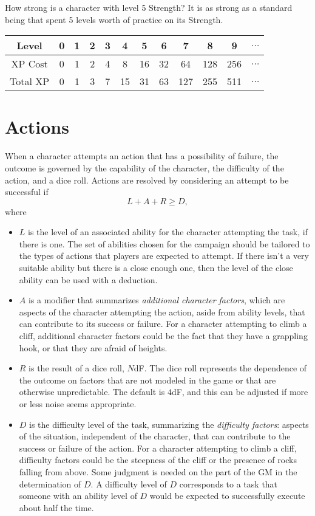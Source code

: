 How strong is a character with level 5 Strength? It is as strong as a standard being that spent 5 levels worth of practice on its Strength.


\begin{center}
\begin{tabular}{|c|c|c|c|c|c|c|c|c|c|c|c|}
\hline
Level    & 0 & 1 & 2 & 3 & 4  & 5  & 6  & 7   & 8   & 9   & $\ldots$ \\ \hline
XP Cost  & 0 & 1 & 2 & 4 & 8  & 16 & 32 & 64  & 128 & 256 & $\ldots$ \\ \hline
Total XP & 0 & 1 & 3 & 7 & 15 & 31 & 63 & 127 & 255 & 511 & $\ldots$ \\ \hline
\end{tabular}
\end{center}


\section{Actions}
When a character attempts an action that has a possibility of failure, the outcome is governed by the capability of the character, the difficulty of the action, and a dice roll.
Actions are resolved by considering an attempt to be successful if
$$L + A + R \geq D,$$
where
\begin{itemize}
\item
$L$ is the level of an associated ability for the character attempting the task, if there is one.
The set of abilities chosen for the campaign should be tailored to the types of actions that players are expected to attempt.
If there isn’t a very suitable ability but there is a close enough one, then the level of the close ability can be used with a deduction.
\item
$A$ is a modifier that summarizes \emph{additional character factors},
which are aspects of the character attempting the action,
aside from ability levels,
that can contribute to its success or failure.
For a character attempting to climb a cliff,
additional character factors could be the fact that they
have a grappling hook,
or that they are afraid of heights.
\item 
$R$ is the result of a dice roll, $N$dF.
The dice roll represents the dependence of the outcome on factors that are not modeled in the game or that are otherwise unpredictable.
The default is $4$dF, and this can be adjusted if more or less noise seems appropriate.
\item
$D$ is the difficulty level of the task,
summarizing the \emph{difficulty factors}: aspects of the situation,
independent of the character,
that can contribute to the success or failure of the action.
For a character attempting to climb a cliff, difficulty factors could be
the steepness of the cliff or the presence of rocks falling from above.
Some judgment is needed on the part of the GM in the determination of $D$.
A difficulty level of $D$ corresponds to a task that someone with an ability level of $D$ would be expected to successfully execute about half the time.
\end{itemize}

